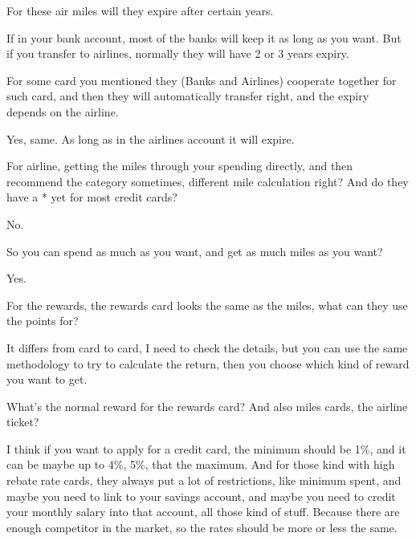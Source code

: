 \begin{description}[leftmargin=4em,style=nextline]
	\item[JH:] For these air miles will they expire after certain years.

	\item[HJ:] If in your bank account, most of the banks will keep it as long as you want. But if you transfer to airlines, normally they will have 2 or 3 years expiry.

	\item[JH:] For some card you mentioned they (Banks and Airlines) cooperate together  for such card, and then they will automatically transfer right, and the expiry depends on the airline.

	\item[HJ:] Yes, same. As long as in the airlines account it will expire.

	\item[JH:] For airline, getting the miles through your spending directly, and then recommend the category sometimes, different mile calculation right? And do they have a * yet for most credit cards?

	\item[HJ:] No.

	\item[JH:] So you can spend as much as you want, and get as much miles as you want?

	\item[HJ:] Yes.

	\item[JH:] For the rewards, the rewards card looks the same as the miles, what can they use the points for?

	\item[HJ:] It differs from card to card, I need to check the details, but you can use the same methodology to try to calculate the return, then you choose which kind of reward you want to get.

	\item[JH:] What’s the normal reward for the rewards card? And also miles cards, the airline ticket?

	\item[HJ:] I think if you want to apply for a credit card, the minimum should be 1\%, and it can be maybe up to 4\%, 5\%, that the maximum. And for those kind with high rebate rate cards, they always put a lot of restrictions, like minimum spent, and maybe you need to link to your savings account, and maybe you need to credit your monthly salary into that account, all those kind of stuff. Because there are enough competitor in the market, so the rates should be more or less the same.


\end{description}
